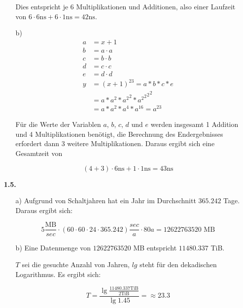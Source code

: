 \documentclass[10pt,a4paper]{article}
\begin{document}
\begin{enumerate}
\begin{enumerate}
                Dies entspricht je 6 Multiplikationen und Additionen, also einer Laufzeit von $6 \cdot 6 \text{ns} + 6 \cdot 1 \text{ns} = 42 \text{ns}$.
            \item[b)]
                $$\begin{array}{ll}
                    a &= x + 1\\
                    b &= a \cdot a\\
                    c &= b \cdot b\\
                    d &= c \cdot c\\
                    e &= d \cdot d\\
                    y &= (x + 1)^{23} = a * b * c * e\\
                    &= a * a^2 * {a^2}^2 * {{{a^2}^2}^2}^2 \\
                    &= a * a^2 * a^4 * a^{16} = a^{23}
                \end{array}$$
                
                Für die Werte der Variablen $a$, $b$, $c$, $d$ und $e$ werden insgesamt 1 Addition und 4 Multiplikationen 
                benötigt, die Berechnung des Endergebnisses erfordert dann 3 weitere Multiplikationen. Daraus ergibt
                sich eine Gesamtzeit von
                
                $$(4 + 3) \cdot 6 \text{ns} + 1 \cdot 1 \text{ns} = 43 \text{ns}$$

        \end{enumerate}

        
    \item[\textbf{1.5.}]
        \begin{enumerate}
            \item[a)]
                Aufgrund von Schaltjahren hat ein Jahr im Durchschnitt $365.242$ Tage. Daraus ergibt sich:
                
                $$5 \frac{\text{MB}}{sec} \cdot (60 \cdot 60 \cdot 24 \cdot 365.242) \frac{sec}{a} \cdot 80 a = 12622763520 \text{ MB}$$
                
            \item[b)]
                Eine Datenmenge von $12622763520$ MB entspricht $11480.337$ TiB.
                
                $T$ sei die gesuchte Anzahl von Jahren, $lg$ steht für den dekadischen Logarithmus. Es ergibt sich:
                
                $$T = \frac{\lg{\frac{11480.337 \text{TiB}}{2 \text{TiB}}}}{\lg{1.45}} = \approx 23.3 $$
                

\end{enumerate}
\end{enumerate}
\end{document}
